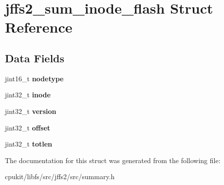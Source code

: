 \hypertarget{structjffs2__sum__inode__flash}{}\section{jffs2\+\_\+sum\+\_\+inode\+\_\+flash Struct Reference}
\label{structjffs2__sum__inode__flash}
\subsection*{Data Fields}
\begin{DoxyCompactItemize}
\item 
\mbox{\label{structjffs2__sum__inode__flash_a0f257448dee5d264f4cc9b36ffb84026}} 
jint16\+\_\+t {\bfseries nodetype}
\item 
\mbox{\label{structjffs2__sum__inode__flash_a0e8c72c149aafc79e611f7df35f2a972}} 
jint32\+\_\+t {\bfseries inode}
\item 
\mbox{\label{structjffs2__sum__inode__flash_a1f9b2df7be306f30852259ae519660fd}} 
jint32\+\_\+t {\bfseries version}
\item 
\mbox{\label{structjffs2__sum__inode__flash_ac4ce29aa9349758ce6e2f1562e656802}} 
jint32\+\_\+t {\bfseries offset}
\item 
\mbox{\label{structjffs2__sum__inode__flash_a640c92d613ee6b2f5c1bc11ceec70a68}} 
jint32\+\_\+t {\bfseries totlen}
\end{DoxyCompactItemize}


The documentation for this struct was generated from the following file\+:\begin{DoxyCompactItemize}
\item 
cpukit/libfs/src/jffs2/src/summary.\+h\end{DoxyCompactItemize}
